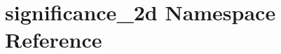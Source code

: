 \hypertarget{namespacesignificance__2d}{
\section{significance\_\-2d Namespace Reference}
\label{namespacesignificance__2d}
}
